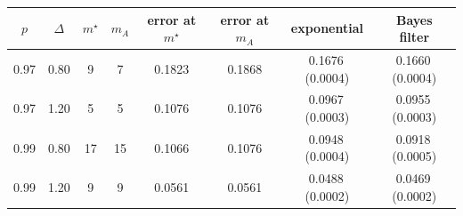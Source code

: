 \begin{tabular}{cccccccc}
\toprule
\(p\) & \(\Delta\) & \(m^\star\) & \(m_A\) & error at \(m^\star\) & error at \(m_A\) & exponential & Bayes filter \\
\midrule
0.97 & 0.80 & 9 & 7 & 0.1823 & 0.1868 & 0.1676\,(0.0004) & 0.1660\,(0.0004) \\
0.97 & 1.20 & 5 & 5 & 0.1076 & 0.1076 & 0.0967\,(0.0003) & 0.0955\,(0.0003) \\
0.99 & 0.80 & 17 & 15 & 0.1066 & 0.1076 & 0.0948\,(0.0004) & 0.0918\,(0.0005) \\
0.99 & 1.20 & 9 & 9 & 0.0561 & 0.0561 & 0.0488\,(0.0002) & 0.0469\,(0.0002) \\
\bottomrule
\end{tabular}
